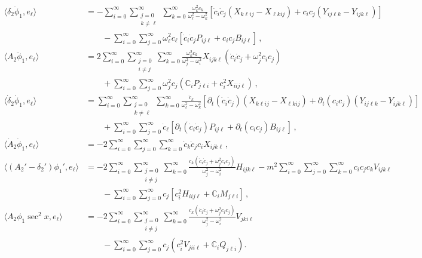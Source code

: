 \documentclass[letterpaper,11pt]{article}
\newcommand{\p}{\partial}
\newcommand{\oi}{\omega_i}
\newcommand{\oj}{\omega_j}
\newcommand{\ok}{\omega_k}
\newcommand{\ol}{\omega_\ell}
\begin{document}
\begin{align}
\langle \delta_2 \ddot \phi_1, e_\ell \rangle &= - \sum_{i = 0}^\infty \sum_{\substack{j=0 \\ k \neq \ell}}^\infty \sum_{k=0}^\infty \frac{\ok^2 c_k}{\ol^2 - \ok^2} \left[\dot c_i \dot c_j \left(X_{k\ell ij} - X_{\ell k i j} \right) + c_i c_j \left( Y_{ij\ell k} - Y_{ijk\ell} \right) \right] \nonumber \\
& \qquad  - \sum_{i=0}^\infty \sum_{j=0}^\infty \ol^2 c_\ell \left[ \dot c_i \dot c_j P_{ij\ell} + c_i c_j B_{i j \ell} \right] \, , \\
%
\langle A_2 \ddot \phi_1, e_\ell \rangle &= 2 \sum_{i = 0}^\infty \sum_{\substack{j=0 \\ i \neq j}}^\infty \sum_{k=0}^\infty \frac{\ok^2 c_k}{\oj^2 - \oi^2} X_{ijk \ell} \left( \dot c_i \dot c_j + \oj^2 c_i c_j \right) \nonumber \\
& \qquad + \sum_{i = 0}^\infty \sum_{j = 0}^\infty \oj^2 c_j \left( \mathbb C_i P_{j \ell i} + c_i^2 X_{ii j \ell} \right) \, , \\
%
\langle \dot \delta_2 \dot \phi_1 , e_\ell \rangle &= \sum_{i = 0}^\infty \sum_{\substack{j=0 \\ k \neq \ell}}^\infty \sum_{k=0}^\infty \frac{\dot c_k}{\ol^2 - \ok^2} \left[ \p_t \left( \dot c_i \dot c_j \right) \left( X_{k\ell ij} - X_{\ell k i j} \right) + \p_t (c_i c_j) \left(Y_{ij\ell k} - Y_{ijk\ell}\right) \right] \nonumber \\
& \qquad+ \sum_{i=0}^\infty \sum_{j=0}^\infty \dot c_\ell \left[ \p_t \left( \dot c_i \dot c_j \right) P_{ij\ell} + \p_t (c_i c_j) B_{ij\ell} \right] \, , \\
%
\langle \dot A_2 \dot \phi_1, e_\ell \rangle &= -2 \sum_{i=0}^\infty \sum_{j=0}^\infty \sum_{k=0}^\infty  \dot c_k \dot c_j c_i X_{ijk\ell} \, , \\
%
\langle \left( A_2' - \delta_2' \right) \phi_1', e_\ell \rangle &= - 2 \sum_{i = 0}^\infty \sum_{\substack{j=0 \\ i \neq j}}^\infty \sum_{k=0}^\infty \frac{c_k (\dot c_i \dot c_j + \oj^2 c_i c_j)}{\oj^2 -\oi^2} H_{ijk\ell} -m^2 \sum_{i=0}^\infty \sum _{j=0}^\infty \sum_{k=0}^\infty c_i c_j c_k V_{ijk\ell} \nonumber \\
%
& \qquad - \sum_{i=0}^\infty \sum_{j=0}^\infty c_j \left[ c_i^2 H_{iij\ell} + \mathbb C_i M_{j \ell i} \right] \, , \\
%
\langle A_2 \phi_1 \sec^2 x, e_\ell \rangle &= - 2\sum_{i = 0}^\infty \sum_{\substack{j=0 \\ i \neq j}}^\infty \sum_{k=0}^\infty \frac{c_k (\dot c_i \dot c_j + \oj^2 c_i c_j )}{\oj^2 - \oi^2} V_{jki\ell} \nonumber \\
& \qquad - \sum_{i=0}^\infty \sum_{j=0}^\infty c_j \left( c_i^2 V_{jii\ell} + \mathbb C_i Q_{j\ell i} \right) .
\end{align}
\end{document}
